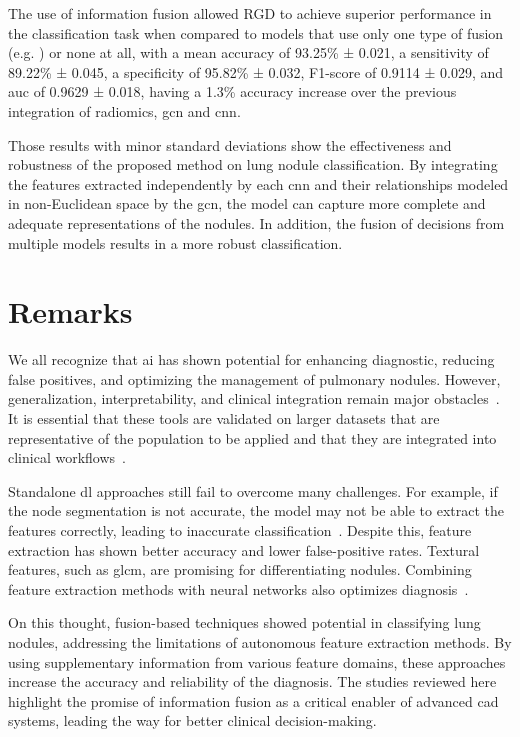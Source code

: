 The use of information fusion allowed RGD to achieve superior performance in the classification task when compared to models that use only one type of fusion (e.g. \cite{xie_fusing_2018}) or none at all, with a mean accuracy of 93.25\% ± 0.021, a sensitivity of 89.22\% ± 0.045, a specificity of 95.82\% ± 0.032, F1-score of 0.9114 ± 0.029, and \ac{auc} of 0.9629 ± 0.018, having a 1.3\% accuracy increase over the previous integration of radiomics, \ac{gcn} and \ac{cnn}.

Those results with minor standard deviations show the effectiveness and robustness of the proposed method on lung nodule classification. By integrating the features extracted independently by each \ac{cnn} and their relationships modeled in non-Euclidean space by the \ac{gcn}, the model can capture more complete and adequate representations of the nodules. In addition, the fusion of decisions from multiple models results in a more robust classification.


\section{Remarks}

We all recognize that \ac{ai} has shown potential for enhancing diagnostic, reducing false positives, and optimizing the management of pulmonary nodules. However, generalization, interpretability, and clinical integration remain major obstacles~\cite{liu_artificial_2022}. It is essential that these tools are validated on larger datasets that are representative of the population to be applied and that they are integrated into clinical workflows~\cite{wu_ai-enhanced_2024}.

Standalone \ac{dl} approaches still fail to overcome many challenges. For example, if the node segmentation is not accurate, the model may not be able to extract the features correctly, leading to inaccurate classification~\cite{gu_survey_2021, shaffie_generalized_2018}. Despite this, feature extraction has shown better accuracy and lower false-positive rates. Textural features, such as \ac{glcm}, are promising for differentiating nodules. Combining feature extraction methods with neural networks also optimizes diagnosis~\cite{mathumetha_feature_2024}.

On this thought, fusion-based techniques showed potential in classifying lung nodules, addressing the limitations of autonomous feature extraction methods. By using supplementary information from various feature domains, these approaches increase the accuracy and reliability of the diagnosis. The studies reviewed here highlight the promise of information fusion as a critical enabler of advanced \ac{cad} systems, leading the way for better clinical decision-making.

